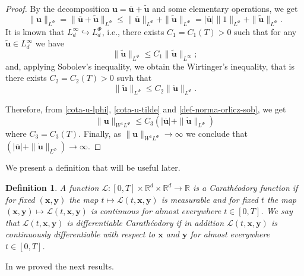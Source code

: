 \documentclass[twoside]{article}
\newtheorem{defi}[thm]{Definition}
\theoremstyle{remark}
\newcommand{\orlnor}{\|_{L^{\Phi}}}
\newcommand{\lphi}{L^{\Phi}}
\newcommand{\sobnor}{\|_{W^{1}\lphi}}
\renewcommand{\b}[1]{\boldsymbol{#1}}
\renewcommand{\leq}{\leqslant}
\begin{document}
\begin{proof}
By the decomposition $\b{u}=\b{\overline u}+\b{\tilde{u}}$ and some elementary operations, 
we get
\begin{equation}\label{cota-u-lphi}
\|\b{u}\orlnor=
\|\b{\overline u}+\b{\tilde{u}}\orlnor\leq 
\|\b{\overline u}\orlnor+\|\b{\tilde{u}}\orlnor=
|\b{\overline u}|\|1\orlnor+\|\b{\tilde{u}}\orlnor.
\end{equation}
It is known that $L^{\infty}_d\hookrightarrow\lphi_d$, i.e.,
there exists $C_1=C_1(T)>0$ such that for any $\b{\tilde{u}}\in L^{\infty}_d$ we have
\[
\|\b{\tilde{u}}\orlnor
\leq 
C_1 \|\b{\tilde{u}}\|_{L^{\infty}};
\]
and, applying  Sobolev's inequality,  we obtain the Wirtinger's inequality, that is there exists $C_2=C_2(T)>0$ suvh that 
\begin{equation}\label{cota-u-tilde}
\|\b{\tilde{u}}\orlnor
\leq 
C_2\|\b{\dot{u}}\orlnor.
\end{equation}

Therefore, from \eqref{cota-u-lphi}, \eqref{cota-u-tilde} and \eqref{def-norma-orlicz-sob}, 
we get
\[
\|\b{u}\sobnor\leq
C_3(|\b{\overline u}|+\|\b{\dot{u}}\orlnor)
\]
where $C_3=C_3(T)$. Finally, as $\|\b{u}\sobnor\to \infty$ we conclude that   
$(|\b{\overline u}|+\|\b{\dot{u}}\orlnor)\to \infty$.
\end{proof}


We present a definition that will be useful later.
 
\begin{defi} A function $\mathcal{L}:[0,T]\times \mathbb{R}^d \times \mathbb{R}^d \rightarrow \mathbb{R}$ is a \emph{Carath\'eodory} function if for fixed $(\b{x},\b{y})$
the map $t \mapsto \mathcal{L}(t, \b{x},\b{y})$ is measurable  and for fixed $t$ the map  $(\b{x},\b{y}) \mapsto \mathcal{L}(t, \b{x}, \b{y})$ is continuous  for almost everywhere $t\in [0,T]$. We say that 
$\mathcal{L}(t, \b{x},\b{y})$ is  \emph{differentiable Carath\'eodory} if in addition $\mathcal{L}(t, \b{x},\b{y})$ is continuously differentiable with respect to $\b{x}$ and $\b{y}$  for almost everywhere $t\in [0,T]$.

\end{defi}


In \cite{ABGMS2015} we proved the next results.
\end{document}
